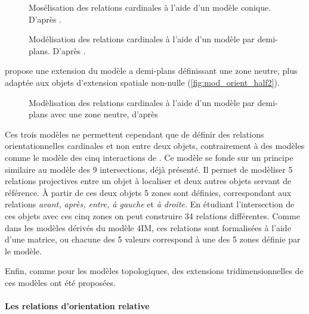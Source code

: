\begin{figure}
  \centering
    
    \caption{Mosélisation des relations cardinales à l'aide d'un
      modèle conique. D'après \textcite{Renz2004}.}
  \label{fig:mod_orient_cone}
\end{figure}

\begin{figure}
  \centering
    
  \caption{Modélisation des relations cardinales à l'aide d'un modèle
    par demi-plans. D'après \textcite{Frank1992}.}
  \label{fig:mod_orient_half}
\end{figure}


\textcite{Frank1992} propose une extension du modèle a demi-plans
définissant une zone neutre, plus adaptée aux objets d'extension
spatiale non-nulle (\autoref{fig:mod_orient_half2}).

\begin{figure}
  \centering
    
  \caption{Modèlisation des relations cardinales à l'aide d'un modèle
    par demi-plans avec une zone neutre, d'après \textcite{Frank1992}}
  \label{fig:mod_orient_half2}
\end{figure}

Ces trois modèles ne permettent cependant que de définir des relations
orientationnelles cardinales et non entre deux objets, contrairement à
des modèles comme le modèle des cinq interactions de
\textcite{Clementini2006}. Ce modèle se fonde sur un principe
similaire au modèle des 9 intersections, déjà présenté. Il permet de
modèliser 5 relations projectives entre un objet à localiser et deux
autres objets servant de référence. À partir de ces deux objets 5
zones sont définies, correspondant aux relations \emph{avant, après,
  entre, à gauche} et \emph{à droite.} En étudiant l'intersection de
ces objets avec ces cinq zones on peut construire 34 relations
différentes. Comme dans les modèles dérivés du modèle 4IM, ces
relations sont formalisées à l'aide d'une matrice, ou chacune des 5
valeurs correspond à une des 5 zones définie par le modèle.

Enfin, comme pour les modèles topologiques, des extensions
tridimensionnelles de ces modèles ont été proposées.


\paragraph{Les relations d'orientation relative}

